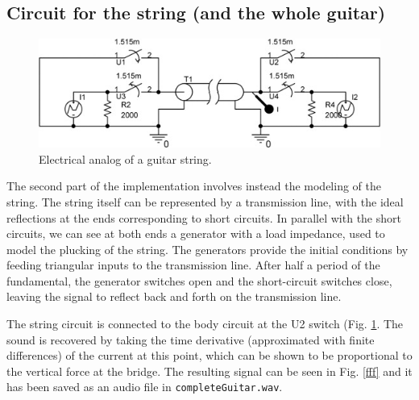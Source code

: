\documentclass[a4paper]{article}
\begin{document}
\subsection{Circuit for the string (and the whole guitar)}
\begin{figure}[h]
	\centering
	\includegraphics[width=0.7\linewidth]{guitar_string.jpg}
	\caption{Electrical analog of a guitar string.}
	\label{fig:guitarstring}
\end{figure}

The second part of the implementation involves instead the modeling of the string. The string itself can be represented by a transmission line, with the ideal reflections at the ends corresponding to short circuits. In parallel with the short circuits, we can see at both ends a generator with a load impedance, used to model the plucking of the string. The generators provide the initial conditions by feeding triangular inputs to the transmission line. After half a period of the fundamental, the generator switches open and the short-circuit switches close, leaving the signal to reflect back and forth on the transmission line.

The string circuit is connected to the body circuit at the U2 switch (Fig. \ref{fig:guitarstring}. The sound is recovered by taking the time derivative (approximated with finite differences) of the current at this point, which can be shown to be proportional to the vertical force at the bridge.  The resulting signal can be seen in Fig. \ref{fff} and it has been saved as an audio file in \texttt{completeGuitar.wav}.




\printbibliography
\end{document}
